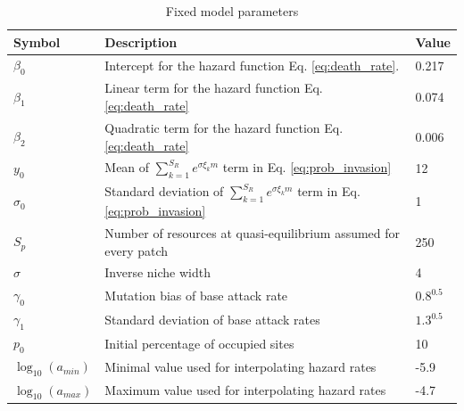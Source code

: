 \documentclass[a4paper]{report}
\DeclareMathOperator{\log}{log}
\begin{document}
\begin{table}[H]
  \caption{Fixed model parameters}\label{tab:parameters_meta}
\begin{tabular}{lll}

Symbol     & Description                                                                                                                                                                                                                      & Value                         \\
\hline
$\beta_0$  & Intercept for the hazard function Eq. \eqref{eq:death_rate}.  & 0.217 \\
\hline
$\beta_1$     & Linear term for the hazard function Eq. \eqref{eq:death_rate} & 0.074                            \\
\hline
$\beta_2$     & Quadratic term for the hazard function Eq. \eqref{eq:death_rate}                                                                                                                                                      & 0.006                              \\
\hline
$y_0$          & Mean of $\sum_{k=1}^{S_R} e^{\sigma \xi_km}$ term in Eq. \eqref{eq:prob_invasion} & 12                              \\
\hline
$\sigma_0$ & Standard deviation of $\sum_{k=1}^{S_R} e^{\sigma \xi_km}$ term  in Eq. \eqref{eq:prob_invasion} & 1                            \\
\hline
$S_p$     & Number of resources at quasi-equilibrium assumed for every patch & 250 \\
\hline
$\sigma$ & Inverse niche width & 4 \\
\hline
$\gamma_0$ & Mutation bias of base attack rate                                                                                                                                                                                           & $0.8^{0.5}$                           \\
\hline
$\gamma_1$ & Standard deviation of base attack rates                                                                                                                                                                                           & $1.3^{0.5}$                           \\
\hline
$p_0$     & Initial percentage of occupied sites & 10 \\
$\log_{10}(a_{min})$     & Minimal value used for interpolating hazard rates & -5.9 \\
\hline
$\log_{10}(a_{max})$     & Maximum value used for interpolating hazard rates & -4.7 \\
\hline
\end{tabular}
\end{table}
\end{document}
